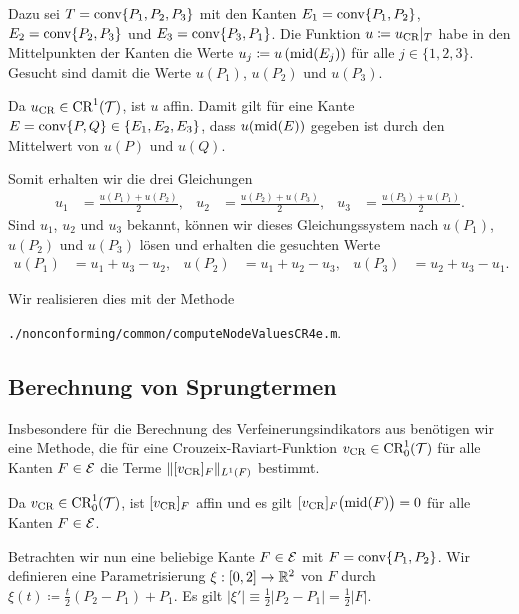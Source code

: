 Dazu sei $T = \textup{conv}\{P_1, P_2, P_3\}$ mit den Kanten
$E_1 = \textup{conv}\{P_1,P_2\}$, $E_2 = \textup{conv}\{P_2,P_3\}$ und $E_3 =
\textup{conv}\{P_3,P_1\}$. 
Die Funktion $u\coloneqq u_\textup{CR}|_T$ habe in den Mittelpunkten der Kanten die Werte
$u_j\coloneqq u\left(\textup{mid}(E_j)\right)$ für alle $j\in\{1,2,3\}$. 
Gesucht sind damit die Werte $u(P_1)$, $u(P_2)$ und $u(P_3)$.

Da $u_\textup{CR}\in\textup{CR}^1(\mathcal{T})$, ist $u$ affin. Damit gilt für eine Kante
$E=\textup{conv}\{P,Q\}\in\{E_1,E_2,E_3\}$, dass $u(\textup{mid}(E))$ gegeben ist durch den
Mittelwert von $u(P)$ und $u(Q)$.

Somit erhalten wir die drei Gleichungen
\begin{align*}
  u_1 &= \frac{u(P_1)+u(P_2)}{2},  
  &u_2 &= \frac{u(P_2)+u(P_3)}{2},  
  &u_3 &= \frac{u(P_3)+u(P_1)}{2}.
\end{align*}
Sind $u_1$, $u_2$ und $u_3$ bekannt, können wir dieses Gleichungssystem nach 
$u(P_1)$, $u(P_2)$ und $u(P_3)$ lösen und erhalten die gesuchten Werte
\begin{align*}
 u(P_1)&=u_1+u_3-u_2, &u(P_2)&= u_1+u_2-u_3,&u(P_3)&=u_2+u_3-u_1.
\end{align*}

Wir realisieren dies mit der Methode
\begin{center}
  \texttt{./nonconforming/common/computeNodeValuesCR4e.m}.
\end{center} 

\subsection{Berechnung von Sprungtermen}

Insbesondere für die Berechnung des Verfeinerungsindikators aus
 benötigen wir eine Methode, die
für eine Crouzeix-Raviart-Funktion
$v_\textup{CR}\in\textup{CR}^1_0(\mathcal{T})$
für alle Kanten $F\in\mathcal{E}$ die Terme $\Vert [v_\textup{CR}]_F\Vert_{L^1(F)}$ 
bestimmt.

Da $v_\textup{CR}\in\textup{CR}^1_0(\mathcal{T})$, ist $[v_\textup{CR}]_F$ affin und es gilt
$[v_\textup{CR}]_F\big(\textup{mid}(F)\big)=0$ für alle Kanten $F\in\mathcal{E}$.

Betrachten wir nun eine beliebige Kante $F\in\mathcal{E}$ mit $F=\textup{conv}\{P_1,P_2\}$. 
Wir definieren eine Parametrisierung $\xi:[0,2]\to\mathbb{R}^2$ von $F$ durch
$\xi(t)\coloneqq \frac{t}{2}(P_2-P_1)+P_1$. 
Es gilt $\left|\xi'\right|\equiv \frac{1}{2}|P_2-P_1|=\frac{1}{2}|F|$.

